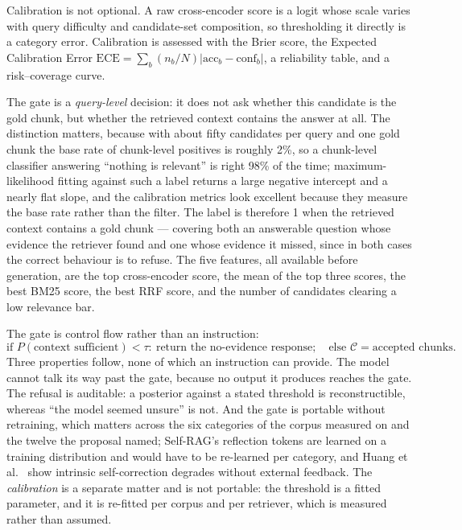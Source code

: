 \documentclass[preprint,3p,times]{elsarticle}
\begin{document}
Calibration is not optional. A raw cross-encoder score is a logit whose scale
varies with query difficulty and candidate-set composition, so thresholding it
directly is a category error. Calibration is assessed with the Brier score, the
Expected Calibration Error
$\mathrm{ECE}=\sum_b (n_b/N)\lvert \mathrm{acc}_b-\mathrm{conf}_b\rvert$, a
reliability table, and a risk--coverage curve.

The gate is a \emph{query-level} decision: it does not ask whether this
candidate is the gold chunk, but whether the retrieved context contains the
answer at all. The distinction matters, because with
about fifty candidates per query and one gold chunk the base rate of
chunk-level positives is roughly 2\%, so a chunk-level classifier answering
``nothing is relevant'' is right 98\% of the time; maximum-likelihood fitting
against such a label returns a large negative intercept and a nearly flat
slope, and the calibration metrics look excellent because they measure the
base rate rather than the filter. The label is therefore 1 when the retrieved
context contains a gold chunk --- covering both an answerable question whose
evidence the retriever found and one whose evidence it missed, since in both
cases the correct behaviour is to refuse. The five features, all available
before generation, are the top cross-encoder score, the mean of the top three
scores, the best BM25 score, the best RRF score, and the number of candidates
clearing a low relevance bar.

The gate is control flow rather than an instruction:
\begin{equation}
\text{if }P(\text{context sufficient})<\tau:\ \text{return the no-evidence response};
\quad\text{else }\mathcal{C}=\text{accepted chunks}.
\end{equation}
Three properties follow, none of which an instruction can provide. The model
cannot talk its way past the gate, because no output it produces reaches the
gate. The refusal is auditable: a posterior against a stated threshold is
reconstructible, whereas ``the model seemed unsure'' is not. And the gate is
portable without retraining, which matters across the
six categories of the corpus measured on and the twelve the
proposal named; Self-RAG's reflection tokens are learned on a training
distribution and would have to be re-learned per category, and Huang
et al.~\cite{huang2024selfcorrect} show intrinsic self-correction degrades
without external feedback. The \emph{calibration} is a separate matter and is
not portable: the threshold is a fitted parameter, and it is re-fitted per
corpus and per retriever, which is measured rather than assumed.
\end{document}
